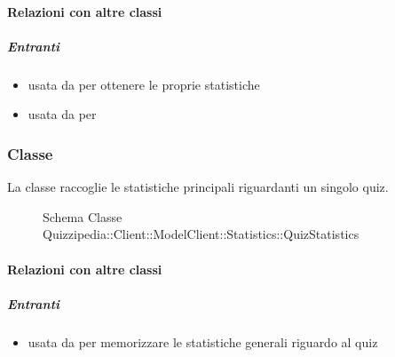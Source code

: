 \paragraph{Relazioni con altre classi}
\subparagraph{Entranti}
\begin{itemize}
\item usata da  per ottenere le proprie statistiche
\item usata da  per 
\end{itemize}
\subsubsection{Classe }
La classe raccoglie le statistiche principali riguardanti un singolo quiz.
\begin{figure}[H]
\centering
\noindent{}
\caption[Schema Classe QuizStatistics]{Schema Classe Quizzipedia::Client::ModelClient::Statistics::QuizStatistics}
\end{figure}
\paragraph{Relazioni con altre classi}
\subparagraph{Entranti}
\begin{itemize}
\item usata da  per memorizzare le statistiche generali riguardo al quiz
\end{itemize}
